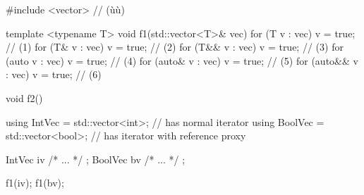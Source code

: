 {{{\begin{emcppslisting}[emcppsbatch=e6,emcppserrorlines={7,8,10}]
#include <vector>  // (ù{}ù)

template <typename T>
void f1(std::vector<T>& vec)
{
    for (T      v : vec) { v = true; }  // (1)
    for (T&     v : vec) { v = true; }  // (2)
    for (T&&    v : vec) { v = true; }  // (3)
    for (auto   v : vec) { v = true; }  // (4)
    for (auto&  v : vec) { v = true; }  // (5)
    for (auto&& v : vec) { v = true; }  // (6)
}

void f2()
{
    using IntVec  = std::vector<int>;   // has normal iterator
    using BoolVec = std::vector<bool>;  // has iterator with reference proxy

    IntVec  iv{ /* ... */ };
    BoolVec bv{ /* ... */ };

    f1(iv);
    f1(bv);
}
\end{emcppslisting}


}}}
